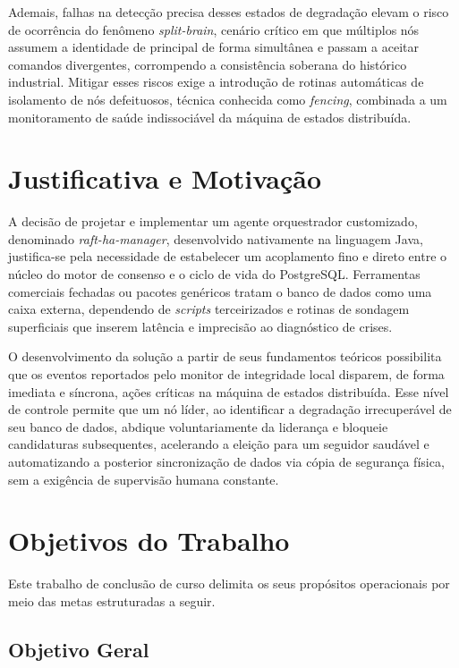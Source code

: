 Ademais, falhas na detecção precisa desses estados de degradação elevam o risco de ocorrência do fenômeno \textit{split-brain}, cenário crítico em que múltiplos nós assumem a identidade de principal de forma simultânea e passam a aceitar comandos divergentes, corrompendo a consistência soberana do histórico industrial. Mitigar esses riscos exige a introdução de rotinas automáticas de isolamento de nós defeituosos, técnica conhecida como \textit{fencing}, combinada a um monitoramento de saúde indissociável da máquina de estados distribuída.

\section{Justificativa e Motivação}

A decisão de projetar e implementar um agente orquestrador customizado, denominado \textit{raft-ha-manager}, desenvolvido nativamente na linguagem Java, justifica-se pela necessidade de estabelecer um acoplamento fino e direto entre o núcleo do motor de consenso e o ciclo de vida do PostgreSQL. Ferramentas comerciais fechadas ou pacotes genéricos tratam o banco de dados como uma caixa externa, dependendo de \textit{scripts} terceirizados e rotinas de sondagem superficiais que inserem latência e imprecisão ao diagnóstico de crises.

O desenvolvimento da solução a partir de seus fundamentos teóricos possibilita que os eventos reportados pelo monitor de integridade local disparem, de forma imediata e síncrona, ações críticas na máquina de estados distribuída. Esse nível de controle permite que um nó líder, ao identificar a degradação irrecuperável de seu banco de dados, abdique voluntariamente da liderança e bloqueie candidaturas subsequentes, acelerando a eleição para um seguidor saudável e automatizando a posterior sincronização de dados via cópia de segurança física, sem a exigência de supervisão humana constante.

\section{Objetivos do Trabalho}

Este trabalho de conclusão de curso delimita os seus propósitos operacionais por meio das metas estruturadas a seguir.

\subsection{Objetivo Geral}

